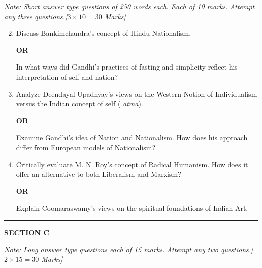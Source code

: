 \documentclass[11pt,a4paper]{article}
\begin{document}
\noindent   \textit{Note: Short answer type questions of 250 words each. Each of 10 marks. Attempt any three questions.\hfill [$3  \times 10 = 30$ Marks]}


\begin{enumerate}[label=   \textbf{\arabic*.}]
    \setcounter{enumi}{1}
    \item Discuss Bankimchandra's concept of Hindu Nationalism.
    
    
\begin{center}   \textbf{OR}\end{center}

    In what ways did Gandhi's practices of fasting and simplicity reflect his interpretation of self and nation?

    \item Analyze Deendayal Upadhyay's views on the Western Notion of Individualism versus the Indian concept of self (   \textit{atma}).
    
    
\begin{center}   \textbf{OR}\end{center}

    Examine Gandhi's idea of Nation and Nationalism. How does his approach differ from European models of Nationalism?

    \item Critically evaluate M. N. Roy's concept of Radical Humanism. How does it offer an alternative to both Liberalism and Marxism?
    
    
\begin{center}   \textbf{OR}\end{center}

    Explain Coomaraswamy's views on the spiritual foundations of Indian Art.
\end{enumerate}

\bigskip
\rule{\linewidth}{0.2pt}
\medskip

\centerline{   \textbf{SECTION C}}
\smallskip



\noindent   \textit{Note: Long answer type questions each of 15 marks. Attempt any two questions.\hfill [$2  \times 15 = 30$ Marks]}
\end{document}
